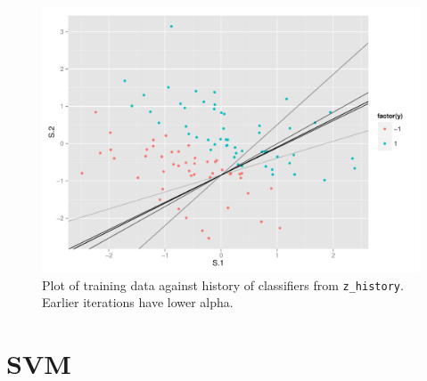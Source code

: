 \documentclass[11pt]{scrartcl}
\begin{document}
\begin{figure}[H]
\centering\includegraphics[width=\textwidth]{./hw2/r/train.pdf}
\caption{Plot of training data against history of classifiers from \texttt{z\_history}. Earlier iterations have lower alpha.}
\end{figure}

\section{SVM}
\end{document}
